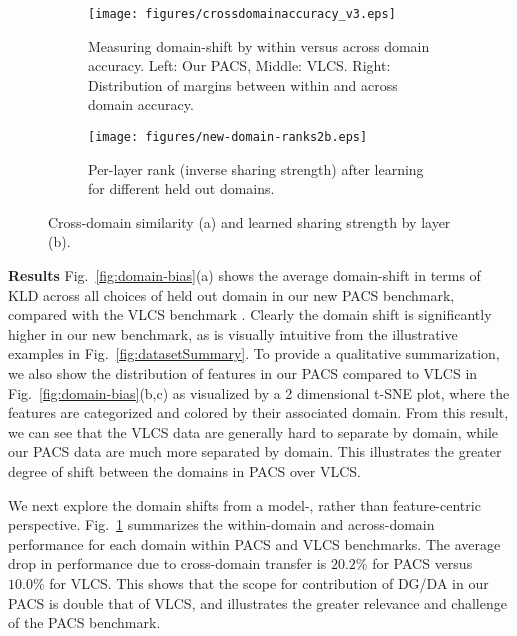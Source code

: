 \documentclass[10pt,twocolumn,letterpaper]{article}
\begin{document}
\begin{figure*}[t]
\centering
\begin{subfigure}{0.70\textwidth}
\texttt{[image: figures/crossdomainaccuracy\_v3.eps]}
\caption{Measuring domain-shift by within versus across domain accuracy. Left: Our PACS, Middle: VLCS. Right: Distribution of margins between within and across domain accuracy.}\label{fig:crossDomainAcc}
\end{subfigure}
\hspace{0.3cm}
\begin{subfigure}{0.26\textwidth}
\texttt{[image: figures/new-domain-ranks2b.eps]}
\caption{Per-layer rank (inverse sharing strength) after learning for different held out domains.}
\label{fig:sharing-strength}
\end{subfigure}
\caption{Cross-domain similarity (a) and learned sharing strength by layer (b).}
\end{figure*}







\vspace{0.2cm}\noindent\textbf{Results}\quad
Fig.~\ref{fig:domain-bias}(a) shows the average domain-shift in terms of KLD across all choices of held out domain in our new PACS benchmark, compared with the VLCS benchmark \cite{torralba2011dataset_bias}. Clearly the domain shift is significantly higher in our new benchmark, as is visually intuitive from the illustrative examples in Fig.~\ref{fig:datasetSummary}. To provide a qualitative summarization, we also show the distribution of features in our PACS compared to VLCS in Fig.~\ref{fig:domain-bias}(b,c) as visualized by a 2 dimensional t-SNE \cite{maaten2008visualizing} plot, where the features are categorized and colored by their associated domain. From this result, we can see that the VLCS data are generally hard to separate by domain, while our PACS data are much more separated by domain. This illustrates the greater degree of shift between the domains in PACS over VLCS. 



We next explore the domain shifts from a model-, rather than feature-centric perspective. Fig.~\ref{fig:crossDomainAcc} summarizes the within-domain and across-domain performance for each domain within PACS and VLCS benchmarks. The average drop in performance due to cross-domain transfer is $20.2\%$ for PACS versus $10.0\%$ for VLCS. This shows that the scope for contribution of DG/DA in our PACS is double that of VLCS, and illustrates the greater relevance and challenge of the PACS benchmark.
\end{document}
